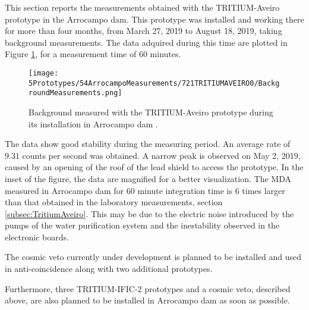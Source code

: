 This section reports the measurements obtained with the TRITIUM-Aveiro prototype in the Arrocampo dam. This prototype was installed and working there for more than four months, from March 27, 2019 to August 18, 2019, taking background measurements. The data adquired during this time are plotted in Figure \ref{fig:BackgroundArrocampoAveiro}, for a measurement time of 60 minutes.

\begin{figure}[h]
\centering
\texttt{[image: 5Prototypes/54ArrocampoMeasurements/721TRITIUMAVEIRO0/BackgroundMeasurements.png]}
\caption{Background measured with the TRITIUM-Aveiro prototype during its installation in Arrocampo dam \cite{ExperimentalPaperCarlos}.\label{fig:BackgroundArrocampoAveiro}}
\end{figure}
The data show good stability during the measuring period. An average rate of $9.31$ counts per second was obtained. A narrow peak is observed on May 2, 2019, caused by an opening of the roof of the lead shield to access the prototype. In the inset of the figure, the data are magnified for a better visualization. The MDA measured in Arrocampo dam for 60 minute integration time is 6 times larger than that obtained in the laboratory measurements, section \ref{subsec:TritiumAveiro}. This may be due to the electric noise introduced by the pumps of the water purification system and the inestability observed in the electronic boards.

The cosmic veto currently under development is planned to be installed and used in anti-coincidence along with two additional prototypes.

Furthermore, three TRITIUM-IFIC-2 prototypes and a cosmic veto, described above, are also planned to be installed in Arrocampo dam as soon as possible.